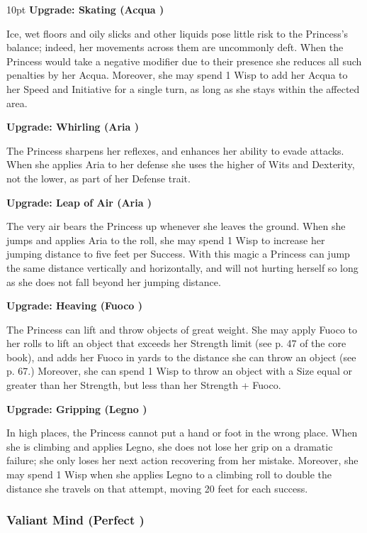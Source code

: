 \begin{myindentpar}{10pt}
\textbf{Upgrade: Skating (Acqua \textbullet)}

Ice, wet floors and oily slicks and other liquids pose little risk to the Princess's balance; indeed, her movements across them are uncommonly deft. When the Princess would take a negative modifier due to their presence she reduces all such penalties by her Acqua. Moreover, she may spend 1 Wisp to add her Acqua to her Speed and Initiative for a single turn, as long as she stays within the affected area.

\textbf{Upgrade: Whirling (Aria \textbullet)}

The Princess sharpens her reflexes, and enhances her ability to evade attacks. When she applies Aria to her defense she uses the higher of Wits and Dexterity, not the lower, as part of her Defense trait. 

\textbf{Upgrade: Leap of Air (Aria \textbullet\textbullet)}

The very air bears the Princess up whenever she leaves the ground. When she jumps and applies Aria to the roll, she may spend 1 Wisp to increase her jumping distance to five feet per Success. With this magic a Princess can jump the same distance vertically and horizontally, and will not hurting herself so long as she does not fall beyond her jumping distance.  

\textbf{Upgrade: Heaving (Fuoco \textbullet\textbullet)}

The Princess can lift and throw objects of great weight. She may apply Fuoco to her rolls to lift an object that exceeds her Strength limit (see p. 47 of the core book), and adds her Fuoco in yards to the distance she can throw an object (see p. 67.) Moreover, she can spend 1 Wisp to throw an object with a Size equal or greater than her Strength, but less than her Strength + Fuoco.

\textbf{Upgrade: Gripping (Legno \textbullet\textbullet)}

In high places, the Princess cannot put a hand or foot in the wrong place. When she is climbing and applies Legno, she does not lose her grip on a dramatic failure; she only loses her next action recovering from her mistake. Moreover, she may spend 1 Wisp when she applies Legno to a climbing roll to double the distance she travels on that attempt, moving 20 feet for each success.\end{myindentpar}

\subsubsection*{Valiant Mind (Perfect \textbullet)}

